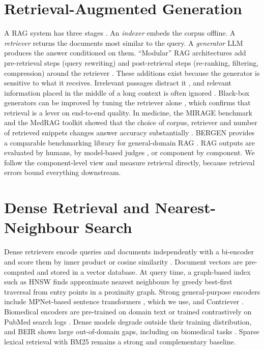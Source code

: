 
\section{Retrieval-Augmented Generation}

A RAG system has three stages \citep{lewis2020rag,gao2023ragsurvey}. An \emph{indexer} embeds the corpus offline. A \emph{retriever} returns the documents most similar to the query. A \emph{generator} LLM produces the answer conditioned on them. ``Modular'' RAG architectures add pre-retrieval steps (query rewriting) and post-retrieval steps (re-ranking, filtering, compression) around the retriever \citep{gao2023ragsurvey}. These additions exist because the generator is sensitive to what it receives. Irrelevant passages distract it \citep{shi2023distractors}, and relevant information placed in the middle of a long context is often ignored \citep{liu2024lost}. Black-box generators can be improved by tuning the retriever alone \citep{shi2024replug}, which confirms that retrieval is a lever on end-to-end quality. In medicine, the MIRAGE benchmark and the MedRAG toolkit showed that the choice of corpus, retriever and number of retrieved snippets changes answer accuracy substantially \citep{xiong2024medrag}. BERGEN provides a comparable benchmarking library for general-domain RAG \citep{rau2024bergen}. RAG outputs are evaluated by humans, by model-based judges \citep{zheng2023judging,es2024ragas}, or component by component. We follow the component-level view and measure retrieval directly, because retrieval errors bound everything downstream.

\section{Dense Retrieval and Nearest-Neighbour Search}

Dense retrievers encode queries and documents independently with a bi-encoder and score them by inner product or cosine similarity \citep{karpukhin2020dpr,reimers2019sbert}. Document vectors are pre-computed and stored in a vector database. At query time, a graph-based index such as HNSW \citep{malkov2020hnsw} finds approximate nearest neighbours by greedy best-first traversal from entry points in a proximity graph. Strong general-purpose encoders include MPNet-based sentence transformers \citep{song2020mpnet}, which we use, and Contriever \citep{izacard2022contriever}. Biomedical encoders are pre-trained on domain text \citep{lee2020biobert,gu2021pubmedbert} or trained contrastively on PubMed search logs \citep{jin2023medcpt}. Dense models degrade outside their training distribution, and BEIR shows large out-of-domain gaps, including on biomedical tasks \citep{thakur2021beir}. Sparse lexical retrieval with BM25 \citep{robertson2009bm25} remains a strong and complementary baseline.


